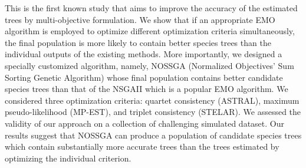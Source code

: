 This is the first known study that aims to improve the accuracy of the estimated trees by multi-objective formulation. We show that if an appropriate EMO algorithm is employed to optimize different optimization criteria simultaneously, the final population is more likely to contain better species trees than the individual outputs of the existing methods.
More importantly, we designed a specially customized algorithm, namely, NOSSGA (Normalized Objectives' Sum Sorting Genetic Algorithm) whose final population contains better candidate species trees than that of the NSGAII which is a popular EMO algorithm.  %
We considered three optimization criteria: quartet consistency (ASTRAL), maximum pseudo-likelihood (MP-EST), and triplet consistency (STELAR). We assessed the validity of our approach on a collection of challenging simulated dataset. Our results suggest that NOSSGA can produce a population of candidate species trees which contain substantially more accurate trees than the trees estimated by optimizing the individual criterion. 




\begin{comment}
\begin{itemize}
	\item We pick three optimization scores from three different methods (ASTRAL, STELAR and MP-EST) to be simultaneously optimized by an EMO algorithm (Section~\ref{sec:problem}).  
	\item We developed an NSGA-II~\cite{deb2002fast}, a popular EMO algorithm, based  framework. Also, based on obtained observations, we designed a custom genetic algorithm whose final population contains better species tree than that of the NSGA-II (Section~\ref{sec:method}). 
	\item Finally based on three simulated datasets, we examine the operation of the two EMO algorithms and then compare their performance with three existing methods (Section~\ref{sec:experiment}). 
\end{itemize}
\end{comment}


